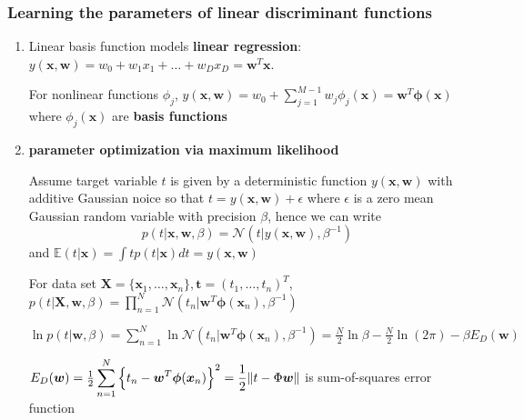 \documentclass[11pt]{article}
\newcommand{\bl}[1] {\boldsymbol{#1}}
\begin{document}
\subsubsection{Learning the parameters of linear discriminant functions}
\label{sec:org703237f}
\begin{enumerate}
\item Linear basis function models
\label{sec:orgb69b6dc}
\textbf{linear regression}:
\(y(\bl{x},\bl{w})=w_0+w_1x_1+\dots+w_Dx_D=\bl{w}^T\bl{x}\).

For nonlinear functions \(\phi_j\),
\(y(\bl{x},\bl{w})=w_0+\displaystyle\sum_{j=1}^{M-1}
     w_j\phi_j(\bl{x})=\bl{w}^T\bl{\phi(\bl{x})}\) where \(\phi_j(\bl{x})\) are
\textbf{basis functions} 
\item \textbf{parameter optimization via maximum likelihood}
\label{sec:org403f5af}

Assume target variable \(t\) is given by a deterministic function
\(y(\bl{x},\bl{w})\) with additive Gaussian noice so that
\(t=y(\bl{x},\bl{w})+\epsilon\) where \(\epsilon\) is a zero mean Gaussian
random variable with precision \(\beta\), hence we can write
\begin{equation*}
p(t|\bl{x},\bl{w},\beta)=\mathcal{N}(t|y(\bl{x},\bl{w}),\beta^{-1})
\end{equation*}
and \(\mathbb{E}(t|\bl{x})=\int tp(t|\bl{x})dt=y(\bl{x},\bl{w})\)

For data set \(\bl{X}=\{\bl{x}_1,\dots,\bl{x}_n\},\bl{t}=(t_1,\dots,t_n)^T\),
\(p(t|\bl{X},\bl{w},\beta)=\displaystyle\prod_{n=1}^N\mathcal{N}(t_n|
     \bl{w}^T\bl{\phi}(\bl{x}_n),\beta^{-1})\)

\(\ln p(t|\bl{w},\beta)=\displaystyle\sum_{n=1}^N\ln\mathcal{N}(t_n|
     \bl{w}^T\bl{\phi}(\bl{x}_n),\beta^{-1})=\frac{N}{2}\ln\beta-\frac{N}{2}\ln(2\pi)-
     \beta E_D(\bl{w})\)

\(E_D(\bl{w})=\frac{1}{2}\displaystyle\sum_{n=1}^N
     \left\{t_n-\bl{w}^T\bl{\phi}(\bl{x}_n)\right\}^2=
     \frac{1}{2}\norm{t-\Phi\bl{w}}\) is sum-of-squares error function


\end{enumerate}
\end{document}
